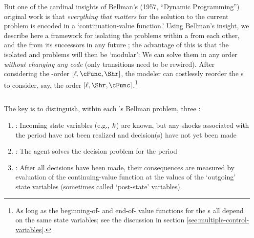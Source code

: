 \documentclass[SolvingMicroDSOPs]{subfiles}
\begin{document}
But one of the cardinal insights of Bellman's (1957, ``Dynamic Programming'') original work is that \emph{everything that matters} for the solution to the current problem is encoded in a `continuation-value function.' %
Using Bellman's insight, we describe here a framework for isolating the {\stg} problems within a {\interval} from each other, and the {\interval} from its successors in any future {\interval}; the advantage of this is that the isolated {\stg} and {\interval} problems will then be `modular': We can solve them in any order \textit{without changing any code} (only transitions need to be rewired). After considering the {\stg}-order $[\ell,\cFunc,\Shr]$, the modeler can costlessly reorder the {\stg}s to consider, say, the order $[\ell,\Shr,\cFunc]$.\footnote{As long as the beginning-of-{\stg} and end-of-{\stg} value functions for the {\stg}s all depend on the same state variables; see the discussion in section \ref{sec:multiple-control-variables}.}

\hypertarget{moves}{}
\subsection{\Moves}\label{subsec:steps}

The key is to distinguish, within each {\stg}'s Bellman problem, three {\moves}:

\begin{enumerate}
\item \textbf{\Arrival}: Incoming state variables (e.g., $k$) are known, but any shocks associated with the period have not been realized and decision(s) have not yet been made
\item \textbf{\Decision}: The agent solves the decision problem for the period
\item \textbf{\Continuation}: After all decisions have been made, their consequences are measured by evaluation of the continuing-value function at the values of the `outgoing' state variables (sometimes called `post-state' variables).
\end{enumerate}
\end{document}
